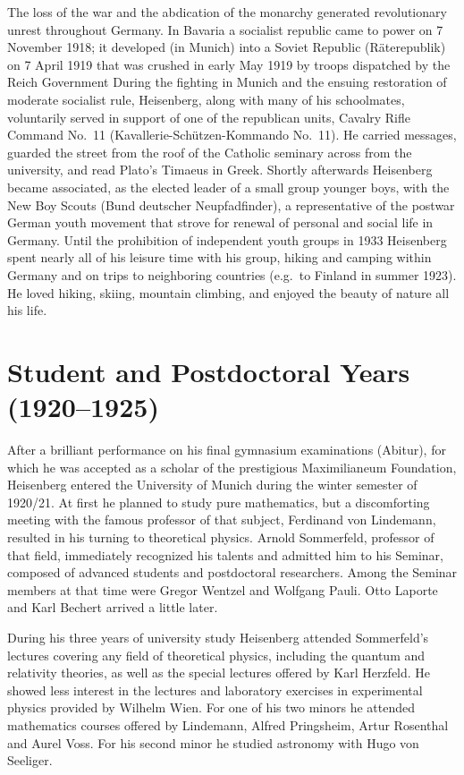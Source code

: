 \documentclass{article}
\begin{document}
The loss of the war and the abdication of the monarchy generated revolutionary unrest throughout Germany. In Bavaria a socialist republic came to power on 7 November 1918; it developed (in Munich) into a Soviet Republic (Räterepublik) on 7 April 1919 that was crushed in early May 1919 by troops dispatched by the Reich Government During the fighting in Munich and the ensuing restoration of moderate socialist rule, Heisenberg, along with many of his schoolmates, voluntarily served in support of one of the republican units, Cavalry Rifle Command No.~11 (Kavallerie-Schützen-Kommando No.~11). He carried messages, guarded the street from the roof of the Catholic seminary across from the university, and read Plato's Timaeus in Greek. Shortly afterwards Heisenberg became associated, as the elected leader of a small group younger boys, with the New Boy Scouts (Bund deutscher Neupfadfinder), a representative of the postwar German youth movement that strove for renewal of personal and social life in Germany. Until the prohibition of independent youth groups in 1933 Heisenberg spent nearly all of his leisure time with his group, hiking and camping within Germany and on trips to neighboring countries (e.g.~to Finland in summer 1923). He loved hiking, skiing, mountain climbing, and enjoyed the beauty of nature all his life.

\section{Student and Postdoctoral Years (1920--1925)}

After a brilliant performance on his final gymnasium examinations (Abitur), for which he was accepted as a scholar of the prestigious Maximilianeum Foundation, Heisenberg entered the University of Munich during the winter semester of 1920/21. At first he planned to study pure mathematics, but a discomforting meeting with the famous professor of that subject, Ferdinand von Lindemann, resulted in his turning to theoretical physics. Arnold Sommerfeld, professor of that field, immediately recognized his talents and admitted him to his Seminar, composed of advanced students and postdoctoral researchers. Among the Seminar members at that time were Gregor Wentzel and Wolfgang Pauli. Otto Laporte and Karl Bechert arrived a little later.

During his three years of university study Heisenberg attended Sommerfeld's lectures covering any field of theoretical physics, including the quantum and relativity theories, as well as the special lectures offered by Karl Herzfeld. He showed less interest in the lectures and laboratory exercises in experimental physics provided by Wilhelm Wien. For one of his two minors he attended mathematics courses offered by Lindemann, Alfred Pringsheim, Artur Rosenthal and Aurel Voss. For his second minor he studied astronomy with Hugo von Seeliger.
\end{document}
